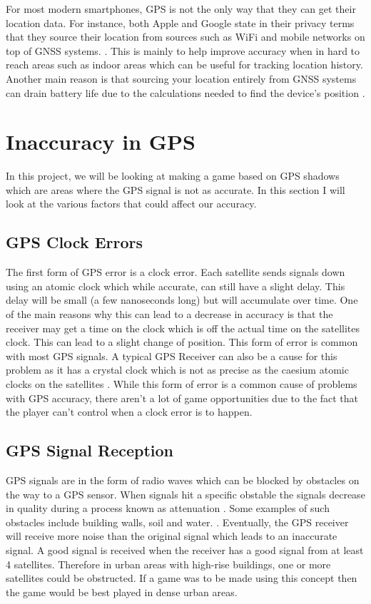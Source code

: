 \documentclass{l4proj}
\begin{document}
For most modern smartphones, GPS is not the only way that they can get their location data.
For instance, both Apple and Google state in their privacy terms that they source their location from sources such as WiFi and mobile networks on
top of GNSS systems. \citep{appleLocation, googleLocation}. This is mainly to help improve accuracy when in hard to reach areas
such as indoor areas which can be useful for tracking location history. Another main reason is that sourcing your location entirely from GNSS systems can drain battery life due
to the calculations needed to find the device's position \citep{brouwers2011detecting}. 

\section{Inaccuracy in GPS}
\label{gpsInaccuracy}

In this project, we will be looking at making a game based on GPS shadows which are areas where the GPS signal is not as accurate. In this section I will look
at the various factors that could affect our accuracy.

\subsection{GPS Clock Errors}

The first form of GPS error is a clock error. Each satellite sends signals down using an atomic clock which while accurate, can still have a 
slight delay. This delay will be small (a few nanoseconds long) but will accumulate over time. One of the main reasons why this can lead to
a decrease in accuracy is that the receiver may get a time on the clock which is off the actual time on the satellites clock. This can lead to
a slight change of position. This form of error is common with most GPS signals. A typical GPS Receiver can also be a cause for this problem as it 
has a crystal clock which is not as precise as the caesium atomic clocks on the satellites \citep{Rabbany2006, Kleusberg1990}. While this
form of error is a common cause of problems with GPS accuracy, there aren't a lot of game opportunities due to the fact that the player
can't control when a clock error is to happen.

\subsection{GPS Signal Reception}
GPS signals are in the form of radio waves which can be blocked by obstacles on the way to a GPS sensor. When signals hit a specific obstable
the signals decrease in quality during a process known as attenuation \citep{Indoor2010}. Some examples of such obstacles include
building walls, soil and water. \citep{Kleusberg1990}. Eventually, the GPS receiver will receive more noise
than the original signal which leads to an inaccurate signal. A good signal is received when the receiver has a good signal from at least 4
satellites. Therefore in urban areas with high-rise buildings, one or more satellites could be obstructed. If a game was to be made
using this concept then the game would be best played in dense urban areas.
\end{document}
